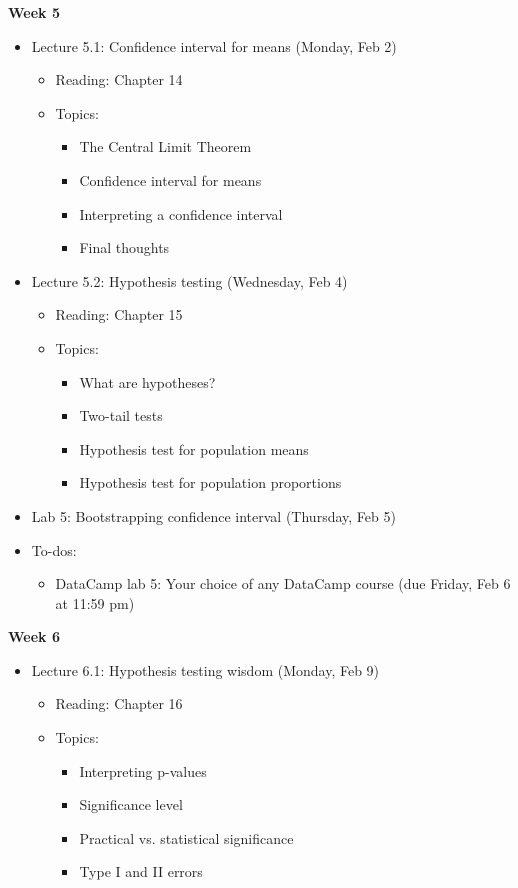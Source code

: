 \documentclass[11pt]{article}
\begin{document}
\large \textbf{Week 5}
\begin{itemize}
    \item Lecture 5.1: Confidence interval for means (Monday, Feb 2)
    \begin{itemize}
        \item Reading: Chapter 14
        \item Topics: 
        \begin{itemize}
            \item The Central Limit Theorem
            \item Confidence interval for means
            \item Interpreting a confidence interval
            \item Final thoughts
        \end{itemize}
    \end{itemize}
    \item Lecture 5.2: Hypothesis testing (Wednesday, Feb 4)
    \begin{itemize}
        \item Reading: Chapter 15
        \item Topics:
        \begin{itemize}
            \item What are hypotheses?
            \item Two-tail tests
            \item Hypothesis test for population means
            \item Hypothesis test for population proportions
        \end{itemize}
    \end{itemize}
    \item Lab 5: Bootstrapping confidence interval (Thursday, Feb 5)
    \item To-dos:
    \begin{itemize}
        \item DataCamp lab 5: Your choice of any DataCamp course (due Friday, Feb 6 at 11:59 pm)
    \end{itemize}
\end{itemize}

\textbf{Week 6}
\begin{itemize}
    \item Lecture 6.1: Hypothesis testing wisdom (Monday, Feb 9)
    \begin{itemize}
        \item Reading: Chapter 16
        \item Topics: 
        \begin{itemize}
            \item Interpreting p-values
            \item Significance level
            \item Practical vs. statistical significance
            \item Type I and II errors
        \end{itemize}
    \end{itemize}
\end{itemize}
\end{document}
